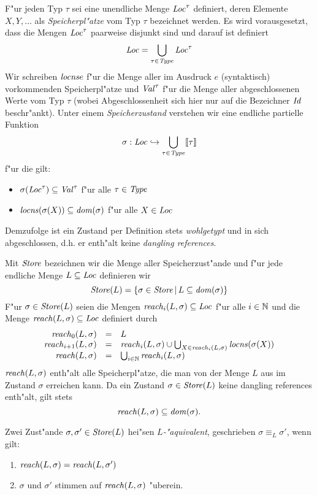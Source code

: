 \documentclass[12pt,a4paper,bigheadings]{scrartcl}
\newcommand{\semantic}[1]{\ensuremath{\llbracket#1\rrbracket}}
\newcommand{\locns}{\name{locns}}
\begin{document}
F"ur jeden Typ $\tau$ sei eine unendliche Menge ${\text{\it Loc\/}}^\tau$ definiert, deren Elemente $X,Y,\ldots$
als {\em Speicherpl"atze} vom Typ $\tau$ bezeichnet werden. Es wird vorausgesetzt, dass die Mengen
${\text{\it Loc\/}}^\tau$ paarweise disjunkt sind und darauf ist definiert
\[
  {\text{\it Loc\/}} = \bigcup_{\tau\in{\text{\it Type\/}}} {\text{\it Loc\/}}^\tau
\]
Wir schreiben $\locns{e}$ f"ur die Menge aller im Ausdruck $e$ (syntaktisch) vorkommenden Speicherpl"atze
und ${\text{\it Val\/}}^\tau$ f"ur die Menge aller abgeschlossenen Werte vom Typ $\tau$ (wobei Abgeschlossenheit sich
hier nur auf die Bezeichner ${\text{\it Id\/}}$ beschr"ankt). Unter einem {\em Speicherzustand} verstehen wir eine
endliche partielle Funktion
\[
  \sigma: \Loc \pto \bigcup_{\tau\in\Type} \semantic{\tau}
\]
f"ur die gilt:
\begin{itemize}
  \item $\sigma({\text{\it Loc\/}}^\tau) \subseteq {\text{\it Val\/}}^\tau$ f"ur alle $\tau\in{\text{\it Type\/}}$
  \item $\locns(\sigma(X)) \subseteq \dom{\sigma}$ f"ur alle $X\in{\text{\it Loc\/}}$
\end{itemize}
Demzufolge ist ein Zustand per Definition stets {\em wohlgetypt} und in sich abgeschlossen,
d.h. er enth"alt keine {\em dangling references}.

Mit ${\text{\it Store\/}}$ bezeichnen wir die Menge aller Speicherzust"ande und f"ur jede endliche Menge
$L \subseteq {\text{\it Loc\/}}$ definieren wir
\[
  {\text{\it Store\/}}(L) = \{\sigma\in{\text{\it Store\/}}\,|\,L\subseteq{\text{\it dom\/}}(\sigma)\}
\]
F"ur $\sigma\in{\text{\it Store\/}}(L)$ seien die Mengen ${\text{\it reach\/}}_i(L,\sigma)\subseteq {\text{\it Loc\/}}$ f"ur alle
$i\in{\mathord{\mathbb N}}$ und die Menge ${\text{\it reach\/}}(L,\sigma)\subseteq{\text{\it Loc\/}}$ definiert durch
\[\begin{array}{rcl}
  \name{reach}_0(L,\sigma) & = & L \\
  \name{reach}_{i+1}(L,\sigma) & = & \name{reach}_i(L,\sigma)
             \cup \bigcup_{X\in\name{reach}_i(L,\sigma)} \locns(\sigma(X)) \\
  \name{reach}(L,\sigma) & = & \bigcup_{i\in\setN} \name{reach}_i(L,\sigma)
\end{array}\]
${\text{\it reach\/}}(L,\sigma)$ enth"alt alle Speicherpl"atze, die man von der Menge $L$ aus im
Zustand $\sigma$ erreichen kann. Da ein Zustand $\sigma\in{\text{\it Store\/}}(L)$ keine dangling references
enth"alt, gilt stets
\[
  {\text{\it reach\/}}(L,\sigma) \subseteq {\text{\it dom\/}}(\sigma).
\]

\begin{definition}[$L$-"Aquivalenz]
  Zwei Zust"ande $\sigma,\sigma'\in{\text{\it Store\/}}(L)$ hei"sen {\em $L$-"aquivalent}, geschrieben
  $\sigma \equiv_L \sigma'$, wenn gilt:
  \begin{enumerate}
    \item ${\text{\it reach\/}}(L,\sigma) = {\text{\it reach\/}}(L,\sigma')$
    \item $\sigma$ und $\sigma'$ stimmen auf ${\text{\it reach\/}}(L,\sigma)$ "uberein.
  \end{enumerate}
\end{definition}
\end{document}
